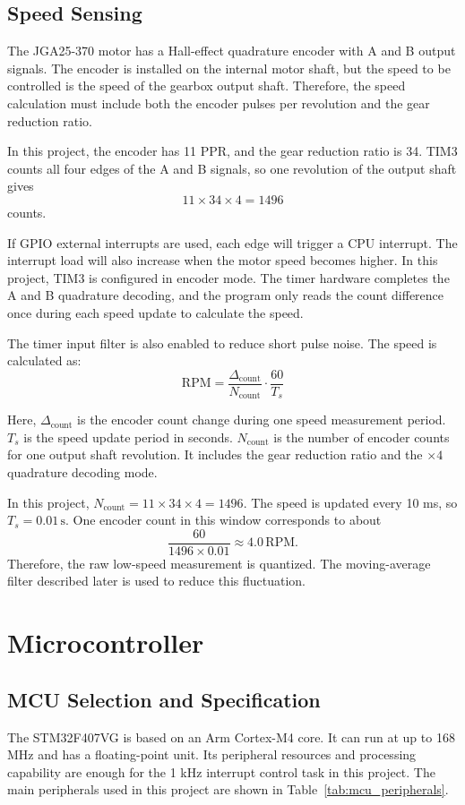 \documentclass[12pt, a4paper]{report}
\begin{document}
\subsection{Speed Sensing}
The JGA25-370 motor has a Hall-effect quadrature encoder with A and B output signals. The encoder is installed on the internal motor shaft, but the speed to be controlled is the speed of the gearbox output shaft. Therefore, the speed calculation must include both the encoder pulses per revolution and the gear reduction ratio.

In this project, the encoder has 11 PPR, and the gear reduction ratio is 34. TIM3 counts all four edges of the A and B signals, so one revolution of the output shaft gives
\[
11 \times 34 \times 4 = 1496
\]
counts.

If GPIO external interrupts are used, each edge will trigger a CPU interrupt. The interrupt load will also increase when the motor speed becomes higher. In this project, TIM3 is configured in encoder mode. The timer hardware completes the A and B quadrature decoding, and the program only reads the count difference once during each speed update to calculate the speed.

The timer input filter is also enabled to reduce short pulse noise. The speed is calculated as:
\begin{equation}
\text{RPM} =
\frac{\Delta_{\text{count}}}{N_{\text{count}}}
\cdot \frac{60}{T_s}
\label{eq:rpm}
\end{equation}

Here, \(\Delta_{\text{count}}\) is the encoder count change during one speed measurement period. \(T_s\) is the speed update period in seconds. \(N_{\text{count}}\) is the number of encoder counts for one output shaft revolution. It includes the gear reduction ratio and the \(\times 4\) quadrature decoding mode.

In this project, \(N_{\text{count}}=11\times34\times4=1496\). The speed is updated every 10 ms, so \(T_s=0.01\,\text{s}\). One encoder count in this window corresponds to about
\[
\frac{60}{1496\times0.01}\approx4.0\,\text{RPM}.
\]
Therefore, the raw low-speed measurement is quantized. The moving-average filter described later is used to reduce this fluctuation.


\section{Microcontroller}


\subsection{MCU Selection and Specification}
The STM32F407VG is based on an Arm Cortex-M4 core. It can run at up to 168 MHz and has a floating-point unit. Its peripheral resources and processing capability are enough for the 1 kHz interrupt control task in this project. The main peripherals used in this project are shown in Table~\ref{tab:mcu_peripherals}.
\end{document}
